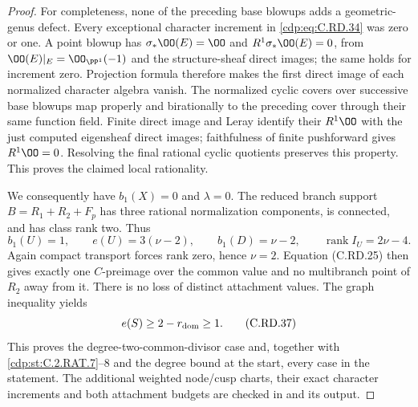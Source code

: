 \begin{proof}
For completeness, none of the preceding
base blowups adds a geometric-genus defect.
Every exceptional character increment in
\eqref{cdp:eq:C.RD.34} was zero or one. A point blowup
has $\sigma_*\OO(E)=\OO$ and
$R^1\sigma_*\OO(E)=0$, from
$\OO(E)|_E=\OO_{\PP^1}(-1)$ and the
structure-sheaf direct images; the same
holds for increment zero. Projection formula
therefore makes the first direct image of
each normalized character algebra vanish.
The normalized cyclic covers over successive
base blowups map properly and birationally
to the preceding cover through their same
function field. Finite direct image and
Leray identify their $R^1\OO$ with the
just computed eigensheaf direct images;
faithfulness of finite pushforward gives
$R^1\OO=0$. Resolving the final rational
cyclic quotients preserves this property.
This proves the claimed local rationality.

We consequently have $b_1(X)=0$ and
$\lambda=0$. The reduced branch support
$B=R_1+R_2+F_p$ has three rational
normalization components, is connected,
and has class rank two. Thus
\[
 b_1(U)=1,\qquad e(U)=3(\nu-2),\qquad
 b_1(D)=\nu-2,\qquad
          \operatorname{rank}I_U=2\nu-4.
\tag{C.RD.36}\label{cdp:eq:C.RD.36}
\]
Again compact transport forces rank zero,
hence $\nu=2$.
Equation (C.RD.25) then gives exactly one
$C$-preimage over the common value and no
multibranch point of $R_2$ away from it.
There is no loss of distinct attachment
values. The graph inequality yields
\[
                    e(S)\ge2-r_{\rm dom}\ge1.
\tag{C.RD.37}\label{cdp:eq:C.RD.37}
\]
This proves the degree-two-common-divisor
case and, together with \ref{cdp:st:C.2.RAT.7}--8 and
the degree bound at the start, every case
in the statement.
The additional weighted node/cusp charts,
their exact character increments and both
attachment budgets are checked in
 and its output.
\end{proof}


